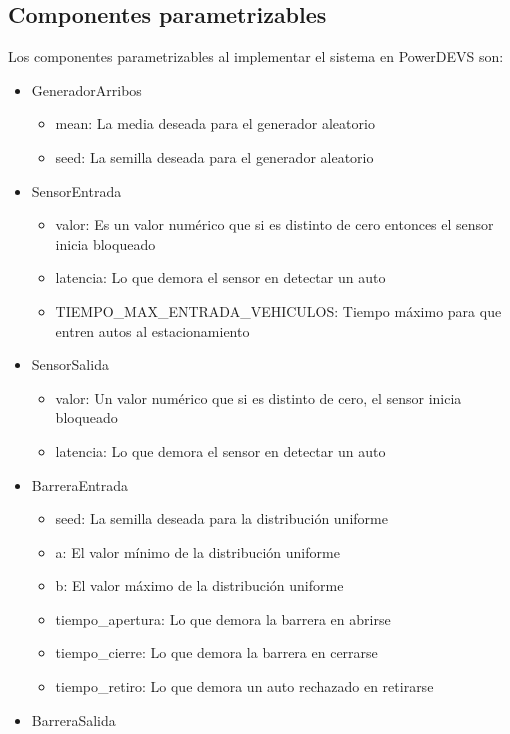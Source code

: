 \documentclass[12pt]{article}
\begin{document}
\subsection{Componentes parametrizables}
\label{sec:componentes_parametrizables}
Los componentes parametrizables al implementar el sistema en PowerDEVS son:
\begin{itemize}
    \item GeneradorArribos
    \begin{itemize}
        \item mean: La media deseada para el generador aleatorio
        \item seed: La semilla deseada para el generador aleatorio
    \end{itemize}
    \item SensorEntrada
    \begin{itemize}
        \item valor: Es un valor numérico que si es distinto de cero entonces el sensor inicia bloqueado
        \item latencia: Lo que demora el sensor en detectar un auto
        \item TIEMPO\_MAX\_ENTRADA\_VEHICULOS: Tiempo máximo para que entren autos al estacionamiento
    \end{itemize}
    \item SensorSalida
    \begin{itemize}
        \item valor: Un valor numérico que si es distinto de cero, el sensor inicia bloqueado
        \item latencia: Lo que demora el sensor en detectar un auto
    \end{itemize}
    \item BarreraEntrada
    \begin{itemize}
        \item seed: La semilla deseada para la distribución uniforme
        \item a: El valor mínimo de la distribución uniforme
        \item b: El valor máximo de la distribución uniforme
        \item tiempo\_apertura: Lo que demora la barrera en abrirse
        \item tiempo\_cierre: Lo que demora la barrera en cerrarse
        \item tiempo\_retiro: Lo que demora un auto rechazado en retirarse
    \end{itemize}
    \item BarreraSalida

\end{itemize}
\end{document}
